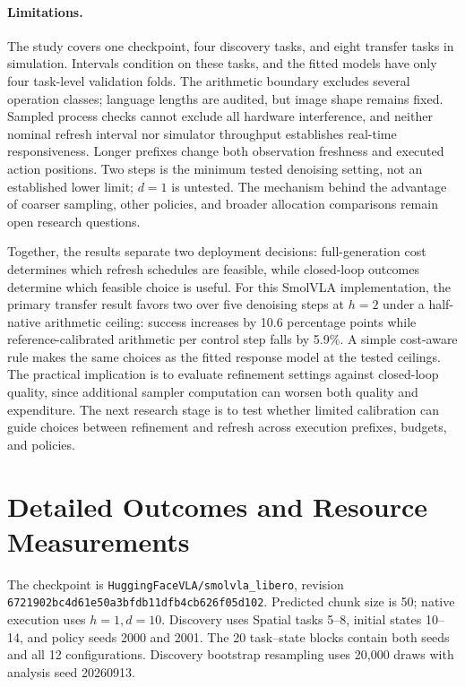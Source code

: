 \documentclass{article}
\begin{document}
\paragraph{Limitations.}
The study covers one checkpoint, four discovery tasks, and eight transfer tasks
in simulation. Intervals condition on these tasks, and the fitted models have
only four task-level validation folds. The arithmetic boundary excludes several
operation classes; language lengths are audited, but image shape remains fixed.
Sampled process checks cannot exclude all hardware interference, and neither
nominal refresh interval nor simulator throughput establishes real-time
responsiveness. Longer prefixes change both observation freshness and executed
action positions. Two steps is the minimum tested denoising setting, not an
established lower limit; $d=1$ is untested. The mechanism behind the advantage
of coarser sampling, other policies, and broader allocation comparisons remain
open research questions.

Together, the results separate two deployment decisions: full-generation cost
determines which refresh schedules are feasible, while closed-loop outcomes
determine which feasible choice is useful. For this SmolVLA implementation,
the primary transfer result favors two over five denoising steps at $h=2$
under a half-native arithmetic ceiling: success increases by 10.6 percentage
points while reference-calibrated arithmetic per control step falls by 5.9\%.
A simple cost-aware rule makes the same choices as the fitted response model
at the tested ceilings. The practical implication is to evaluate refinement
settings against closed-loop quality, since additional sampler computation can
worsen both quality and expenditure. The next research stage is to test whether
limited calibration can guide choices between refinement and refresh across
execution prefixes, budgets, and policies.

\clearpage

{\raggedright}
\clearpage
\appendix

\section{Detailed Outcomes and Resource Measurements}
\label{app:calibration}

{\raggedright
The checkpoint is \texttt{HuggingFaceVLA/smolvla\_libero}, revision
\texttt{6721902bc4d61e50a3bfdb11dfb4cb626f05d102}. Predicted chunk size is 50;
native execution uses $h=1,d=10$. Discovery uses Spatial tasks 5--8, initial
states 10--14, and policy seeds 2000 and 2001. The 20 task--state blocks
contain both seeds and all 12 configurations. Discovery bootstrap resampling uses
20,000 draws with analysis seed 20260913.\par}
\end{document}
